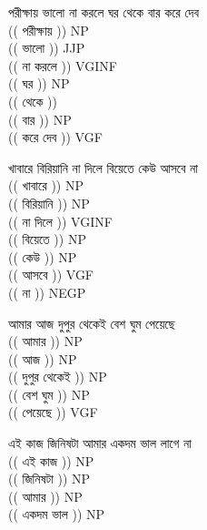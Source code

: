 \documentclass[11pt,a4paper,twocolumn]{article}
\begin{document}
\begin{enumerate}
{		\item পরীক্ষায় ভালো না করলে ঘর থেকে বার করে দেব  \\
		$ $\\
		\textcolor{diff}{(( পরীক্ষায় ))} NP\\
		\textcolor{diff}{(( ভালো ))} JJP\\
		\textcolor{diff}{(( না করলে ))} VGINF\\
		\textcolor{diff}{(( ঘর ))} NP\\
		\textcolor{diff}{(( থেকে  ))} \\
		\textcolor{diff}{(( বার ))} NP\\
		\textcolor{diff}{(( করে দেব ))} VGF\\
$ $\\
		\item খাবারে বিরিয়ানি না দিলে বিয়েতে কেউ আসবে না  \\
		$ $\\
		\textcolor{diff}{(( খাবারে ))} NP\\
		\textcolor{diff}{(( বিরিয়ানি ))} NP\\
		\textcolor{diff}{(( না দিলে ))} VGINF\\
		\textcolor{diff}{(( বিয়েতে ))} NP\\
		\textcolor{diff}{(( কেউ ))} NP\\
		\textcolor{diff}{(( আসবে ))} VGF\\
		\textcolor{diff}{(( না ))} NEGP\\
$ $\\
		\item আমার আজ দুপুর থেকেই বেশ ঘুম পেয়েছে  \\
		$ $\\
		\textcolor{diff}{(( আমার ))} NP\\
		\textcolor{diff}{(( আজ ))} NP\\
		\textcolor{diff}{(( দুপুর থেকেই ))} NP\\
		\textcolor{diff}{(( বেশ ঘুম ))} NP\\
		\textcolor{diff}{(( পেয়েছে ))} VGF\\
$ $\\
		\item এই কাজ জিনিষটা আমার একদম ভাল লাগে না  \\
		$ $\\
		\textcolor{diff}{(( এই কাজ ))} NP\\
		\textcolor{diff}{(( জিনিষটা ))} NP\\
		\textcolor{diff}{(( আমার ))} NP\\
		\textcolor{diff}{(( একদম ভাল ))} NP\\
}
\end{enumerate}
\end{document}
